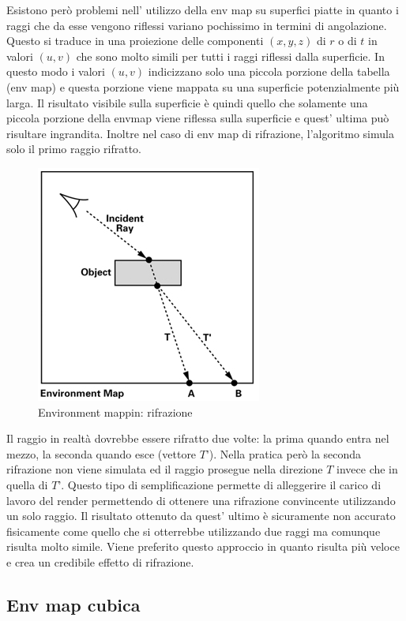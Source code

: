 Esistono però problemi nell’ utilizzo della env map su superfici piatte in quanto i raggi che da esse vengono riflessi variano pochissimo in termini di angolazione. Questo si traduce in una proiezione delle componenti $(x,y,z)$ di $r$ o di $t$ in valori $(u,v)$ che sono molto simili per tutti i raggi riflessi dalla superficie. In questo modo i valori $(u,v)$ indicizzano solo una piccola porzione della tabella (env map) e questa porzione viene mappata su una superficie potenzialmente più larga. Il risultato visibile sulla superficie è quindi quello che solamente una piccola porzione della envmap viene riflessa sulla superficie e quest’ ultima può risultare ingrandita.
Inoltre nel caso di env map di rifrazione, l’algoritmo simula solo il primo raggio rifratto.
\\
\begin{figure}[htb]
\centering
\includegraphics[width=0.5\linewidth]{images/chapter_stato_arte/stato_arte_refr_2.png}\hfill
\caption[Environment mapping: rifrazione]{Environment mappin: rifrazione}
\label{fig:stato_arte_refr_2}
\end{figure}

Il raggio in realtà dovrebbe essere rifratto due volte: la prima quando entra nel mezzo, la seconda quando esce (vettore $T’$). Nella pratica però la seconda rifrazione non viene simulata ed il raggio prosegue nella direzione $T$ invece che in quella di $T’$. 
Questo tipo di semplificazione permette di alleggerire il carico di lavoro del render permettendo di ottenere una rifrazione convincente utilizzando un solo raggio.
Il risultato ottenuto da quest’ ultimo è sicuramente non accurato fisicamente come quello che si otterrebbe utilizzando due raggi ma comunque risulta molto simile.
Viene preferito questo approccio in quanto risulta più veloce e crea un credibile effetto di rifrazione.

\subsection{Env map cubica}
\label{sec:chapter_stato_arte_envmap_cubica}

